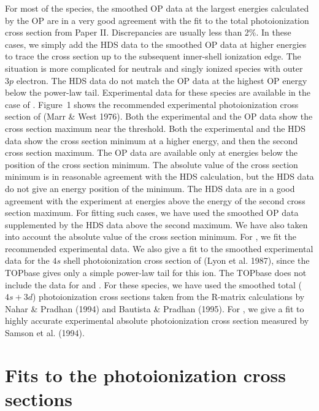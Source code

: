 For most of the species, the smoothed OP data at the largest energies 
calculated by the OP are in a very good agreement with the fit to the total 
photoionization cross section from Paper II. Discrepancies are usually less 
than 2\%. In these cases, we simply add the HDS data to the smoothed OP data at
higher energies to trace the cross section up to the subsequent inner-shell 
ionization edge. The situation is more complicated for neutrals and singly 
ionized species with outer $3p$ electron. The HDS data do not match the OP 
data at the highest OP energy below the power-law tail.
Experimental data for these species are
available in the case of . Figure~1 shows the recommended
experimental photoionization cross section of  
(Marr \& West 1976).
Both the experimental and the OP data show the cross section maximum near the 
threshold. Both the experimental and the HDS data show the cross section
minimum at a higher energy, and then the second cross section maximum. The OP 
data are available only at energies below the position of the cross section 
minimum. The absolute value of the cross section minimum is in reasonable 
agreement with the HDS calculation, but the HDS data do not give an energy 
position of the minimum. The HDS data are in a good agreement with the 
experiment at energies above the energy of the second cross section maximum.
For fitting such cases, we have used the smoothed OP data supplemented by the 
HDS data above the second maximum. We have also taken into account the absolute
value of the cross section minimum. For , we fit the recommended 
experimental data. We also give a fit to the smoothed experimental data for the
$4s$ shell photoionization cross section of  
(Lyon et al. 1987),
since the TOPbase gives only a simple power-law tail for this ion. The TOPbase 
does not include the data for  and . For these species, 
we have used the smoothed total ($4s+3d$) photoionization cross sections taken 
from the R-matrix calculations by  
Nahar \& Pradhan (1994) and  Bautista \& 
Pradhan (1995). For , we give a fit to highly accurate experimental
absolute photoionization cross section measured by 
Samson et al. (1994).

\section{Fits to the photoionization cross sections}

